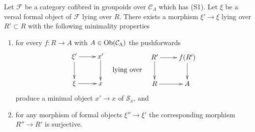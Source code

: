 \begin{lemma}
\label{lemma-smallest-where-descends-versal}
Let $\mathcal{F}$ be a category cofibred in groupoids over
$\mathcal{C}_\Lambda$ which has (S1). Let $\xi$ be a versal formal object
of $\mathcal{F}$ lying over $R$. There exists a morphism $\xi' \to \xi$
lying over $R' \subset R$ with the following minimality properties
\begin{enumerate}
\item for every $f : R \to A$ with $A \in \mathop{\mathrm{Ob}}\nolimits(\mathcal{C}_\Lambda)$
the pushforwards
$$
\vcenter{
\xymatrix{
\xi' \ar[d] \ar[r] & x' \ar[d] \\
\xi \ar[r] & x
}
}
\quad\text{lying over}\quad
\vcenter{
\xymatrix{
R' \ar[d] \ar[r] & f(R') \ar[d] \\
R \ar[r] & A
}
}
$$
produce a minimal object $x' \to x$ of $\mathcal{S}_x$, and
\item for any morphism of formal objects $\xi'' \to \xi'$
the corresponding morphism $R'' \to R'$ is surjective.
\end{enumerate}
\end{lemma}

